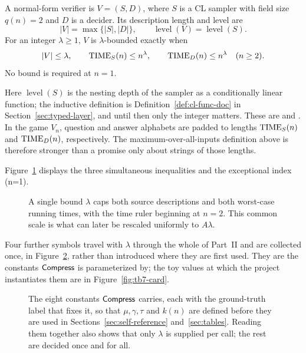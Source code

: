\begin{definition}
\label{def:paper-lambda}
A normal-form verifier is \(V=(S,D)\), where \(S\) is a CL sampler with field
size \(q(n)=2\) and \(D\) is a decider.  Its description length and level are
\[
 |V|=\max\{|S|,|D|\},\qquad
 \operatorname{level}(V)=\operatorname{level}(S).
\]
For an integer \(\lambda\geq1\), \(V\) is \(\lambda\)-bounded exactly when
\[
 |V|\leq\lambda,\qquad
 \operatorname{TIME}_S(n)\leq n^\lambda,\qquad
 \operatorname{TIME}_D(n)\leq n^\lambda\quad(n\geq2).
\]
No bound is required at \(n=1\).
\end{definition}

Here \(\operatorname{level}(S)\) is the nesting depth of the sampler as a
conditionally linear function; the inductive definition is
Definition~\ref{def:cl-func-doc} in Section~\ref{sec:typed-layer}, and until
then only the integer matters.  These are  and
.
In the game \(V_n\), question and answer alphabets are padded to lengths
\(\operatorname{TIME}_S(n)\) and \(\operatorname{TIME}_D(n)\), respectively.  The maximum-over-all-inputs
definition above is therefore stronger than a promise only about strings of
those lengths.

Figure~\ref{fig:lambda-bounded} displays the three simultaneous inequalities
and the exceptional index (n=1).
\begin{figure}[t]
\centering

\caption{A single bound \(\lambda\) caps both source descriptions and both worst-case running times, with the time ruler beginning at \(n=2\).  This common scale is what can later be rescaled uniformly to \(A\lambda\).}
\label{fig:lambda-bounded}
\end{figure}

Four further symbols travel with \(\lambda\) through the whole of Part~II and
are collected once, in Figure~\ref{fig:parameter-card}, rather than introduced
where they are first used.  They are the constants \(\mathsf{Compress}\) is
parameterized by; the toy values at which the project instantiates them are in
Figure~\ref{fig:tb7-card}.
\begin{figure}[H]
\centering

\caption{The eight constants \(\mathsf{Compress}\) carries, each with the ground-truth label that fixes it, so that \(\mu,\gamma,\tau\) and \(k(n)\) are defined before they are used in Sections~\ref{sec:self-reference} and~\ref{sec:tables}.  Reading them together also shows that only \(\lambda\) is supplied per call; the rest are decided once and for all.}
\label{fig:parameter-card}
\end{figure}

